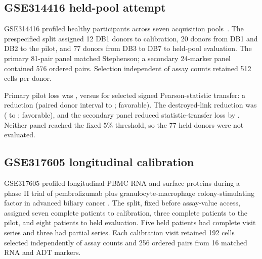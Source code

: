 \documentclass[10pt,a4paper]{article}
\begin{document}
\subsection{GSE314416 held-pool attempt}

GSE314416 profiled healthy participants across seven acquisition pools~\cite{babdor2026}. The prespecified split assigned 12 DB1 donors to calibration, 20 donors from DB1 and DB2 to the pilot, and 77 donors from DB3 to DB7 to held-pool evaluation. The primary 81-pair panel matched Stephenson; a secondary 24-marker panel contained 576 ordered pairs. Selection independent of assay counts retained 512 cells per donor.

Primary pilot loss was \GSEThreeOneFourPrimaryLoss{}, versus \GSEThreeOneFourResidualLoss{} for selected signed Pearson-statistic transfer: a \GSEThreeOneFourResidualReduction{} reduction (paired donor interval \GSEThreeOneFourResidualCILo{} to \GSEThreeOneFourResidualCIHi{}; \GSEThreeOneFourResidualFav{} favorable). The destroyed-link reduction was \GSEThreeOneFourDestroyedReduction{} (\GSEThreeOneFourDestroyedCILo{} to \GSEThreeOneFourDestroyedCIHi{}; \GSEThreeOneFourDestroyedFav{} favorable), and the secondary panel reduced statistic-transfer loss by \GSEThreeOneFourBroadReduction{}. Neither panel reached the fixed 5\% threshold, so the 77 held donors were not evaluated.

\subsection{GSE317605 longitudinal calibration}

GSE317605 profiled longitudinal PBMC RNA and surface proteins during a phase II trial of pembrolizumab plus granulocyte-macrophage colony-stimulating factor in advanced biliary cancer \cite{kelley2026}. The split, fixed before assay-value access, assigned seven complete patients to calibration, three complete patients to the pilot, and eight patients to held evaluation. Five held patients had complete visit series and three had partial series. Each calibration visit retained 192 cells selected independently of assay counts and 256 ordered pairs from 16 matched RNA and ADT markers.
\end{document}
